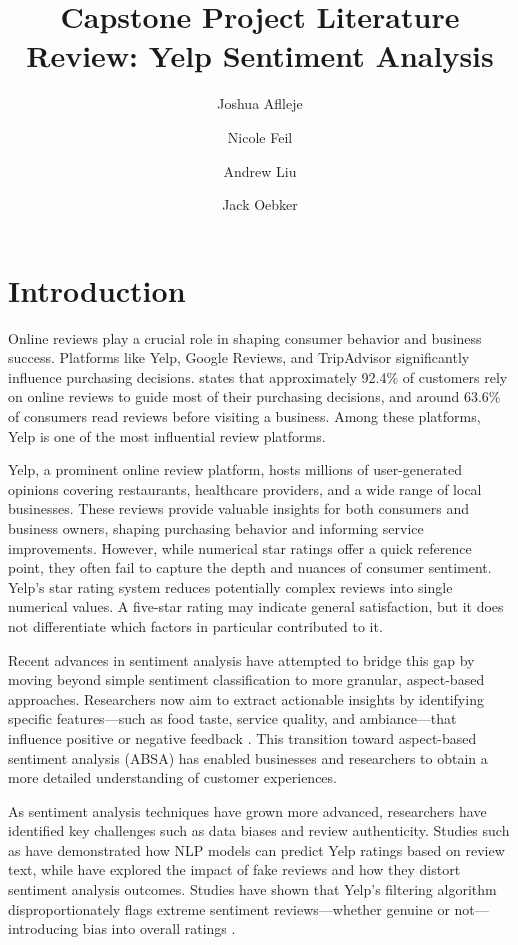 \documentclass{article}
\title{Capstone Project Literature Review: Yelp Sentiment Analysis}
\author{Joshua Aflleje}
\author{Nicole Feil}
\author{Andrew Liu}
\author{Jack Oebker}
\affil{Arizona State University, Tempe, AZ 85281, USA}
\begin{document}
\maketitle

\section{Introduction}
Online reviews play a crucial role in shaping consumer behavior and business success. Platforms like Yelp, Google Reviews, and TripAdvisor significantly influence purchasing decisions. \cite{reviewtrackers2025} states that approximately 92.4\% of customers rely on online reviews to guide most of their purchasing decisions, and around 63.6\% of consumers read reviews before visiting a business. Among these platforms, Yelp is one of the most influential review platforms. 

Yelp, a prominent online review platform, hosts millions of user-generated opinions covering restaurants, healthcare providers, and a wide range of local businesses. These reviews provide valuable insights for both consumers and business owners, shaping purchasing behavior and informing service improvements. However, while numerical star ratings offer a quick reference point, they often fail to capture the depth and nuances of consumer sentiment. Yelp’s star rating system reduces potentially complex reviews into single numerical values. A five-star rating may indicate general satisfaction, but it does not differentiate which factors in particular contributed to it. 

Recent advances in sentiment analysis have attempted to bridge this gap by moving beyond simple sentiment classification to more granular, aspect-based approaches. Researchers now aim to extract actionable insights by identifying specific features—such as food taste, service quality, and ambiance—that influence positive or negative feedback \citep{HuLiu2004}. This transition toward aspect-based sentiment analysis (ABSA) has enabled businesses and researchers to obtain a more detailed understanding of customer experiences.

As sentiment analysis techniques have grown more advanced, researchers have identified key challenges such as data biases and review authenticity. Studies such as \cite{Liang2018} have demonstrated how NLP models can predict Yelp ratings based on review text, while \cite{Mukherjee2021} have explored the impact of fake reviews and how they distort sentiment analysis outcomes. Studies have shown that Yelp’s filtering algorithm disproportionately flags extreme sentiment reviews—whether genuine or not—introducing bias into overall ratings \cite{Mukherjee2021}.
\end{document}
